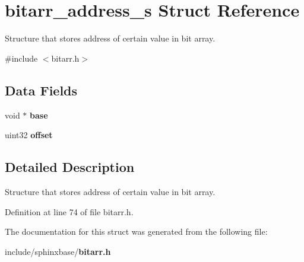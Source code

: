 \section{bitarr\-\_\-address\-\_\-s Struct Reference}
\label{structbitarr__address__s}


Structure that stores address of certain value in bit array.  




{\ttfamily \#include $<$bitarr.\-h$>$}

\subsection*{Data Fields}
\begin{DoxyCompactItemize}
\item 
void $\ast$ {\bfseries base}\label{structbitarr__address__s_a2ac6eb57a1f8feea9d3ab947af61cd26}

\item 
uint32 {\bfseries offset}\label{structbitarr__address__s_a25e454a04427113d373f6200a6c87de2}

\end{DoxyCompactItemize}


\subsection{Detailed Description}
Structure that stores address of certain value in bit array. 

Definition at line 74 of file bitarr.\-h.



The documentation for this struct was generated from the following file\-:\begin{DoxyCompactItemize}
\item 
include/sphinxbase/{\bf bitarr.\-h}\end{DoxyCompactItemize}
